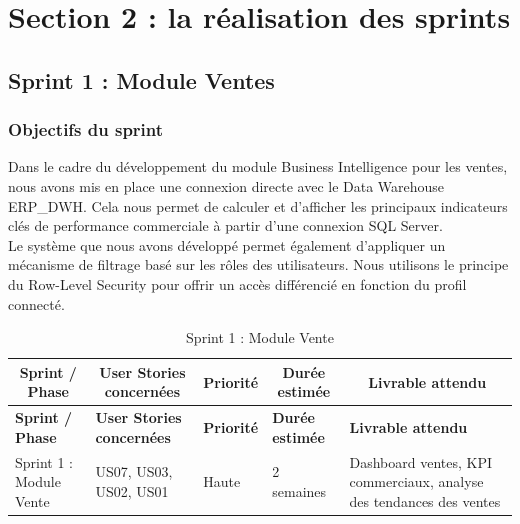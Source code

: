 \section{Section 2 : la réalisation des sprints }
\subsection{Sprint 1 : Module Ventes}
\subsubsection{Objectifs du sprint}
Dans le cadre du développement du module Business Intelligence pour les ventes, nous avons mis en place une connexion directe avec le Data Warehouse ERP\_DWH. Cela nous permet de calculer et d'afficher les principaux indicateurs clés de performance commerciale à partir d'une connexion SQL Server.\\
Le système que nous avons développé permet également d'appliquer un mécanisme de filtrage basé sur les rôles des utilisateurs. Nous utilisons le principe du Row-Level Security pour offrir un accès différencié en fonction du profil connecté. 

{ \small
\renewcommand{\arraystretch}{1.2} %
\setlength{\tabcolsep}{4pt}

\begin{longtable}{|p{3cm}|p{2.5cm}|p{1.2cm}|p{2cm}|p{4.5cm}|}
\caption{Sprint 1 : Module Vente} \\
\hline
\multicolumn{1}{|c|}{\textbf{Sprint / Phase}} & 
\multicolumn{1}{c|}{\textbf{User Stories concernées}} & 
\multicolumn{1}{c|}{\textbf{Priorité}} & 
\multicolumn{1}{c|}{\textbf{Durée estimée}} & 
\multicolumn{1}{c|}{\textbf{Livrable attendu}} \\
\hline
\endfirsthead

\hline

\textbf{Sprint / Phase} & \textbf{User Stories concernées} & \textbf{Priorité} & \textbf{Durée estimée} & \textbf{Livrable attendu} \\
\hline
\endhead

\hline
\endfoot

Sprint 1 : Module Vente & US07, US03, US02, US01 & Haute & 2 semaines & Dashboard ventes, KPI commerciaux, analyse des tendances des ventes \\
\hline

\end{longtable}

}
